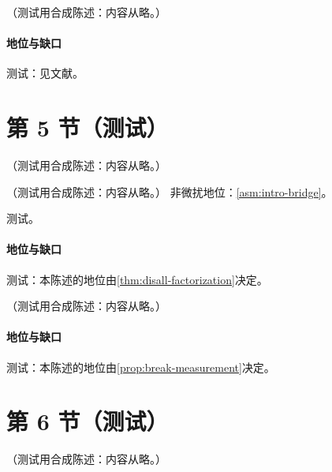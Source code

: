 \begin{proposition}\label{prop:break-jet-veto}
（测试用合成陈述：内容从略。）
\end{proposition}
\paragraph{地位与缺口}测试：见文献。

\section{第 5 节（测试）}\label{sec:break-diffraction}

\begin{definition}\label{def:break-diffraction}
（测试用合成陈述：内容从略。）
\end{definition}

\begin{theorem}\label{thm:break-ddis}
（测试用合成陈述：内容从略。）
非微扰地位：\cref{asm:intro-bridge}。
\end{theorem}
\begin{proofsketch}测试。\end{proofsketch}
\paragraph{地位与缺口}测试：本陈述的地位由\cref{thm:disall-factorization}决定。

\begin{proposition}\label{prop:break-hh-diffraction}
（测试用合成陈述：内容从略。）
\end{proposition}
\paragraph{地位与缺口}测试：本陈述的地位由\cref{prop:break-measurement}决定。

\section{第 6 节（测试）}\label{sec:break-dps}

\begin{definition}\label{def:break-dpdf}
（测试用合成陈述：内容从略。）
\end{definition}

